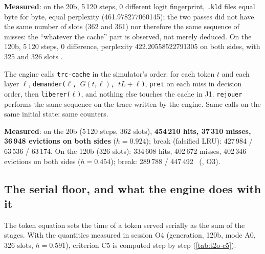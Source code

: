 \textbf{Measured}: on the 20b, 5\,120 steps, 0 different logit fingerprint, \texttt{.kld} files equal byte for byte, equal perplexity (461.978277060145); the two passes did not have the same number of slots (362 and 361) nor therefore the same sequence of misses: the \enquote{whatever the cache} part is observed, not merely deduced. On the 120b, 5\,120 steps, 0 difference, perplexity 422.20558522791305 on both sides, with 325 and 326 slots \mes.

\begin{proposition}\label{prop:t2o-compte}
The engine calls \texttt{trc-cache} in the simulator's order: for each token $t$ and each layer $\ell$, \texttt{demander($\ell$, $G(t,\ell)$, $tL + \ell$)}, \texttt{pret} on each miss in decision order, then \texttt{liberer($\ell$)}, and nothing else touches the cache in J1. \texttt{rejouer} performs the same sequence on the trace written by the engine. Same calls on the same initial state: same counters.
\end{proposition}

\textbf{Measured}: on the 20b (5\,120 steps, 362 slots), \textbf{454\,210 hits, 37\,310 misses, 36\,948 evictions on both sides} ($h = 0.924$); break (falsified LRU): 427\,984 / 63\,536 / 63\,174. On the 120b (326 slots): 334\,608 hits, 402\,672 misses, 402\,346 evictions on both sides ($h = 0.454$); break: 289\,788 / 447\,492 \mes~(, O3).

\subsection{The serial floor, and what the engine does with it}

The token equation sets the time of a token served serially as the sum of the stages. With the quantities measured in session O4 (generation, 120b, mode A0, 326 slots, $h = 0.591$), criterion C5 is computed step by step (\cref{tab:t2o-c5}).

